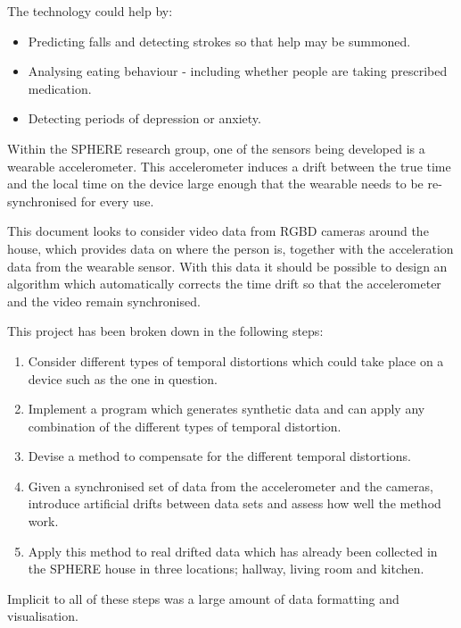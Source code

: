 The technology could help by:
\begin{itemize}
    \item Predicting falls and detecting strokes so that help may be summoned.
    \item Analysing eating behaviour - including whether people are taking prescribed medication.
    \item Detecting periods of depression or anxiety.
\end{itemize}
\cite{sphere_website}

Within the SPHERE research group, one of the sensors being developed is a wearable accelerometer.
This accelerometer induces a drift between the true time and the local time on
the device large enough that the wearable needs to be re-synchronised for every use.

This document looks to consider video data from RGBD cameras around the house,
which provides data on where the person is, together with the acceleration data
from the wearable sensor. With this data it should be possible to design an
algorithm which automatically corrects the time drift so that the accelerometer
and the video remain synchronised.

This project has been broken down in the following steps:
\begin{enumerate}
    \item Consider different types of temporal distortions which could take place
        on a device such as the one in question.
    \item Implement a program which generates synthetic data and can apply any combination
        of the different types of temporal distortion.
    \item Devise a method to compensate for the different temporal distortions.
    \item Given a synchronised set of data from the accelerometer and the
        cameras, introduce artificial drifts between data sets and assess how well
        the method work.
    \item Apply this method to real drifted data which has already been
        collected in the SPHERE house in three locations; hallway, living room and kitchen.
\end{enumerate}

Implicit to all of these steps was a large amount of data formatting and
visualisation.
